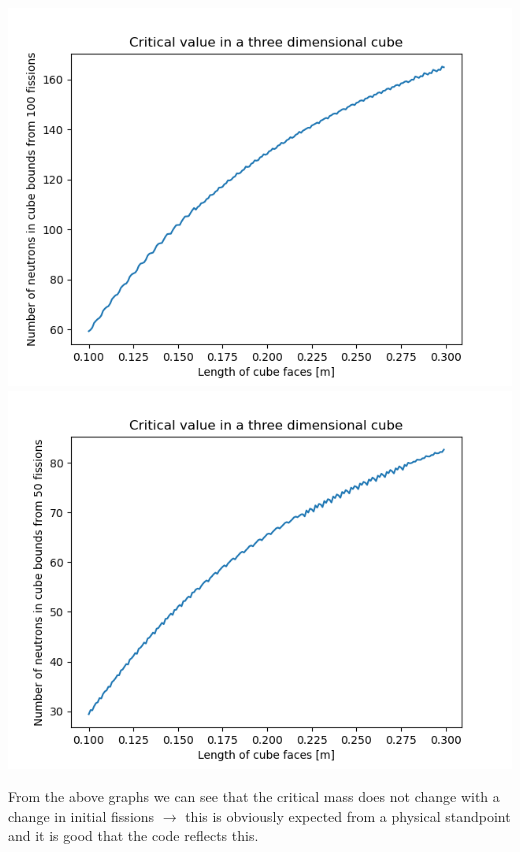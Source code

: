 \documentclass[a4paper,english]{article}
\begin{document}
    \begin{center}
    \includegraphics[width=\textwidth]{./4.png}
    \includegraphics[width=\textwidth]{./4_2.png}
    \end{center}
    From the above graphs we can see that the critical mass does not change with a change in initial fissions $\rightarrow$ this is obviously expected from a physical standpoint and it is good that the code reflects this.
\end{document}
